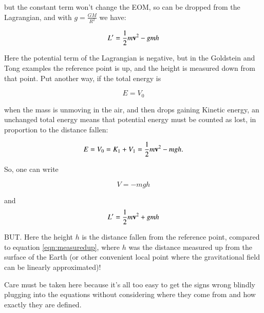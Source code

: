 \documentclass{article}      %
\begin{document}
but the constant term won't change the EOM, so can be dropped from the Lagrangian, and with $g=\frac{GM}{R^2}$ we have:

\begin{equation}\label{eqn:measuredup}
L' = \frac{1}{2} m \mathbf{v}^2 - g m h
\end{equation}

Here the potential term of the Lagrangian is negative, but in the Goldstein and Tong examples the reference point is up, and the height is measured down
from that point.  Put another way, if the total energy is 

\begin{equation*}
E = V_0
\end{equation*}

when the mass is unmoving in the air, and then drops gaining Kinetic energy, an unchanged total energy means that potential energy must be counted as lost, in proportion to the distance fallen:

\begin{equation*}
E = V_0 = K_1 + V_1 = \frac{1}{2} m \mathbf{v}^2 - m g h.
\end{equation*}

So, one can write

\begin{equation*}
V = -m g h
\end{equation*}

and 
\begin{equation}\label{eqn:measureddown}
L' = \frac{1}{2} m \mathbf{v}^2 + g m h
\end{equation}

BUT.  Here the height $h$ is the distance fallen from the reference point, compared to equation \ref{eqn:measuredup}, where $h$ was the distance measured up from the surface of the Earth (or other convenient local point where the gravitational field can be linearly approximated)!

Care must be taken here because it's all too easy to get the signs wrong blindly plugging into the equations without considering where they come from and how exactly they are defined.
\end{document}
